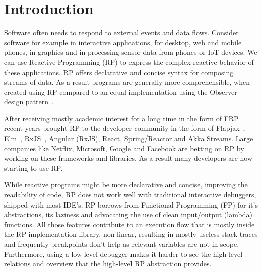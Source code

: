 \section{Introduction}
Software often needs to respond to external events and data flows. Consider software for example in interactive applications, for desktop, web and mobile phones, in graphics and in processing sensor data from phones or IoT-devices. We can use Reactive Programming (RP) to express the complex reactive behavior of these applications. RP offers declarative and concise syntax for composing streams of data. As a result programs are generally more comprehensible, when created using RP compared to an equal implementation using the Observer design pattern~\cite{johnson1995design, salvaneschi2014empirical}.

After receiving mostly academic interest for a long time in the form of FRP~\cite{elliott1997functional,elliott2009push,czaplicki2013asynchronous,maier2010deprecating} recent years brought RP to the developer community in the form of Flapjax~\cite{meyerovich2009flapjax}, Elm~\cite{czaplicki2012elm}, RxJS~\cite{meijer2010subject}, Angular (RxJS), React, Spring/Reactor and Akka Streams. Large companies like Netflix, Microsoft, Google and Facebook are betting on RP by working on these frameworks and libraries. As a result many developers are now starting to use RP.



While reactive programs might be more declarative and concise, improving the readability of code, RP does not work well with traditional interactive debuggers, shipped with most IDE's. RP borrows from Functional Programming (FP) for it's abstractions, its laziness and advocating the use of clean input/output (lambda) functions. All those features contribute to an execution flow that is mostly inside the RP implementation library, non-linear, resulting in mostly useless stack traces and frequently breakpoints don't help as relevant variables are not in scope. Furthermore, using a low level debugger makes it harder to see the high level relations and overview that the high-level RP abstraction provides.


